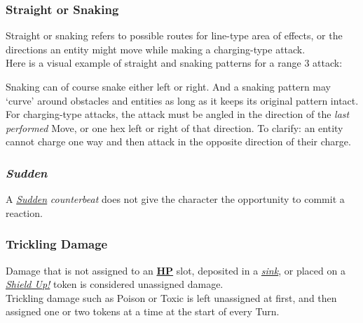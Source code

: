 \documentclass[12pt]{article}
\newcommand{\refto}[1]{\hyperlink{#1}{\textbf{#1}}}
\newcommand{\reftoit}[1]{\hyperlink{#1}{\emph{#1}}}
\begin{document}
\begin{multicols*}{2}
\subsubsection{Straight or Snaking}
Straight or snaking refers to possible routes for line-type area of effects, or the directions an entity might move while making a charging-type attack.\\
Here is a visual example of straight and snaking patterns for a range 3 attack:
\begin{center}
\end{center}
Snaking can of course snake either left or right. And a snaking pattern may ‘curve’ around obstacles and entities as long as it keeps its original pattern intact.\\
For charging-type attacks, the attack must be angled in the direction of the \emph{last performed} Move, or one hex left or right of that direction. To clarify: an entity cannot charge one way and then attack in the opposite direction of their charge.

\subsubsection{\emph{Sudden}}
\hypertarget{Sudden}{}
A \reftoit{Sudden} \emph{counterbeat} does not give the character the opportunity to commit a reaction.

\subsubsection{Trickling Damage}
Damage that is not assigned to an \refto{HP} slot, deposited in a \reftoit{sink}, or placed on a \reftoit{Shield Up!} token is considered unassigned damage.\\
Trickling damage such as Poison or Toxic is left unassigned at first, and then assigned one or two tokens at a time at the start of every Turn.


\end{multicols*}
\end{document}
